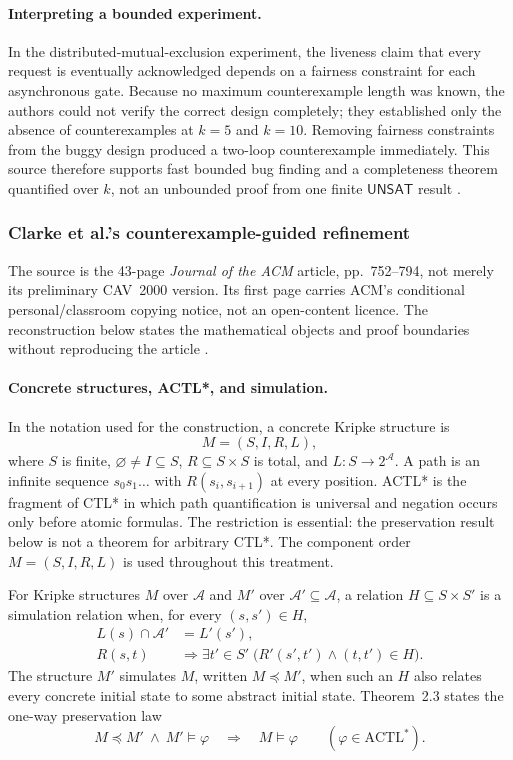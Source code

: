 \paragraph{Interpreting a bounded experiment.}
In the distributed-mutual-exclusion experiment,
the liveness claim that every request is eventually acknowledged depends on a
fairness constraint for each asynchronous gate.  Because no maximum
counterexample length was known, the authors could not verify the correct
design completely; they established only the absence of counterexamples at
\(k=5\) and \(k=10\).  Removing fairness constraints from the buggy design
produced a two-loop counterexample immediately.  This source therefore
supports fast bounded bug finding and a completeness theorem quantified over
\(k\), not an unbounded proof from one finite \(\mathsf{UNSAT}\) result
\cite[\S\S5--6 and tables~3--4]{BiereCimattiClarkeZhu1999}.

\subsubsection{Clarke et al.'s counterexample-guided refinement}
\label{sec:p09-n-c-017-cegar}

The source is the 43-page \emph{Journal of the ACM} article, pp.~752--794, not
merely its preliminary CAV~2000 version.
Its first page carries ACM's conditional personal/classroom copying notice,
not an open-content licence.  The reconstruction below states the mathematical
objects and proof boundaries without reproducing the article
\cite{ClarkeEtAl2003}.

\paragraph{Concrete structures, ACTL*, and simulation.}
In the notation used for the construction, a concrete Kripke structure is
\[
 M=(S,I,R,L),
\]
where \(S\) is finite, \(\varnothing\ne I\subseteq S\),
\(R\subseteq S\times S\) is total, and \(L:S\to2^{\mathcal A}\).  A path is
an infinite sequence \(s_0s_1\ldots\) with \(R(s_i,s_{i+1})\) at every
position.  ACTL* is the fragment of CTL* in which path quantification is
universal and negation occurs only before atomic formulas.  The restriction is
essential: the preservation result below is not a theorem for arbitrary CTL*.
The component order \(M=(S,I,R,L)\) is used throughout this treatment.

For Kripke structures \(M\) over \(\mathcal A\) and \(M'\) over
\(\mathcal A'\subseteq\mathcal A\), a relation
\(H\subseteq S\times S'\) is a simulation relation when, for every
\((s,s')\in H\),
\[
\begin{aligned}
 L(s)\cap\mathcal A'&=L'(s'),\\
 R(s,t)&\Longrightarrow
   \exists t'\in S'\;\bigl(R'(s',t')\land(t,t')\in H\bigr).
\end{aligned}
\]
The structure \(M'\) simulates \(M\), written \(M\preceq M'\), when such an
\(H\) also relates every concrete initial state to some abstract initial state.
Theorem~2.3 states the one-way preservation law
\[
 M\preceq M'\ \land\ M'\models\varphi
 \quad\Longrightarrow\quad
 M\models\varphi
 \qquad(\varphi\in\mathrm{ACTL}^*).
\]

